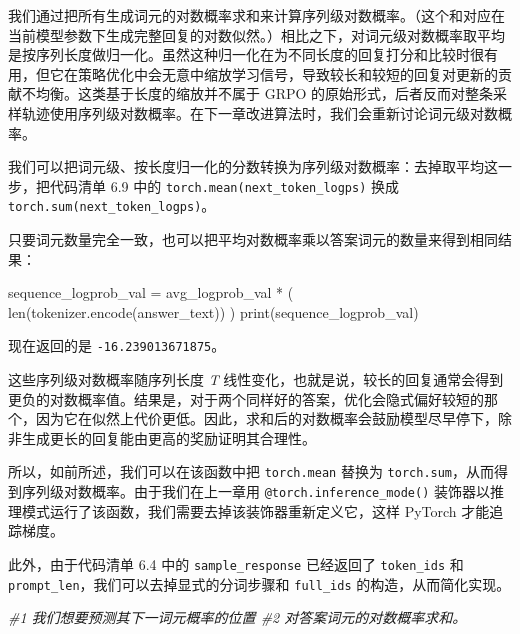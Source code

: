 我们通过把所有生成词元的对数概率求和来计算序列级对数概率。（这个和对应在当前模型参数下生成完整回复的对数似然。）相比之下，对词元级对数概率取平均是按序列长度做归一化。虽然这种归一化在为不同长度的回复打分和比较时很有用，但它在策略优化中会无意中缩放学习信号，导致较长和较短的回复对更新的贡献不均衡。这类基于长度的缩放并不属于 GRPO 的原始形式，后者反而对整条采样轨迹使用序列级对数概率。在下一章改进算法时，我们会重新讨论词元级对数概率。

我们可以把词元级、按长度归一化的分数转换为序列级对数概率：去掉取平均这一步，把代码清单 6.9 中的 \texttt{torch.mean(next\_token\_logps)} 换成 \texttt{torch.sum(next\_token\_logps)}。

只要词元数量完全一致，也可以把平均对数概率乘以答案词元的数量来得到相同结果：

\begin{codebox}
sequence_logprob_val = avg_logprob_val * (
    len(tokenizer.encode(answer_text))
)
print(sequence_logprob_val)
\end{codebox}

现在返回的是 \texttt{-16.239013671875}。

这些序列级对数概率随序列长度 \emph{T} 线性变化，也就是说，较长的回复通常会得到更负的对数概率值。结果是，对于两个同样好的答案，优化会隐式偏好较短的那个，因为它在似然上代价更低。因此，求和后的对数概率会鼓励模型尽早停下，除非生成更长的回复能由更高的奖励证明其合理性。

所以，如前所述，我们可以在该函数中把 \texttt{torch.mean} 替换为 \texttt{torch.sum}，从而得到序列级对数概率。由于我们在上一章用 \texttt{@torch.inference\_mode()} 装饰器以推理模式运行了该函数，我们需要去掉该装饰器重新定义它，这样 PyTorch 才能追踪梯度。

此外，由于代码清单 6.4 中的 \texttt{sample\_response} 已经返回了 \texttt{token\_ids} 和 \texttt{prompt\_len}，我们可以去掉显式的分词步骤和 \texttt{full\_ids} 的构造，从而简化实现。

{\noindent\small\textit{\#1 我们想要预测其下一词元概率的位置 \newline \#2 对答案词元的对数概率求和。}\par}


